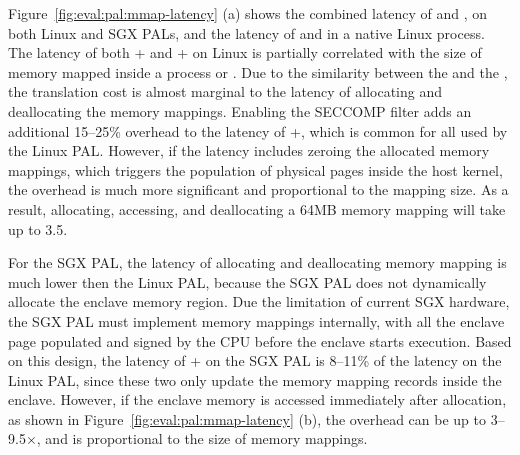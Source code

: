 Figure~\ref{fig:eval:pal:mmap-latency} (a)
shows the combined latency of  and  , on both Linux and SGX PALs,
and the latency of  and  in a native Linux process.
The latency of both + and + on Linux is partially correlated with the size of memory mapped inside a process or \picoproc{}.
Due to the similarity between the \hostapis{} and the \linuxapis{},
the translation cost is almost marginal
to the latency of allocating and deallocating the memory mappings.
Enabling the SECCOMP filter adds an additional
15--25\% overhead to the latency of +, which is common for all \linuxapis{} used by the Linux PAL.
However, if the latency includes zeroing the allocated memory mappings,
which triggers the population of physical pages
inside the host kernel,
the overhead is much more significant and proportional to the mapping size.
As a result, allocating, accessing, and deallocating a 64MB memory mapping will take up to \roughly{}3.5\msec{}.


For the SGX PAL, the latency of allocating and deallocating memory mapping
is much lower then the Linux PAL, because the SGX PAL does not dynamically allocate the enclave memory region.
Due the limitation of current SGX hardware,
the SGX PAL must implement memory mappings internally,
with all the enclave page populated and signed by the CPU before the enclave starts execution.
Based on this design, the latency of + on the SGX PAL
is 8--11\% of the latency on the Linux PAL,
since these two \hostapis{} only update the memory mapping records inside the enclave.
However, if the enclave memory is accessed immediately after allocation, as shown in Figure~\ref{fig:eval:pal:mmap-latency} (b),
the overhead can be up to 3--9.5$\times$, and is proportional to the size of memory mappings.


